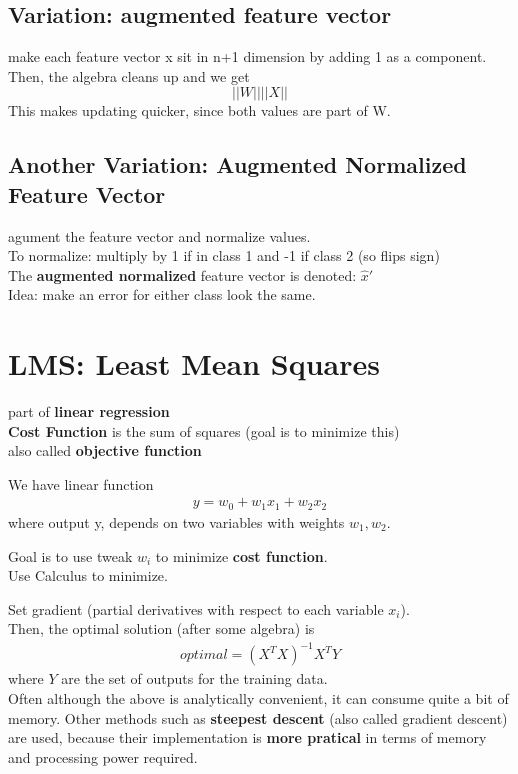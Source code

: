 \documentclass[12pt]{article}
\newcommand{\bt}[1]{\textbf{#1}} %
\newcommand{\eq}[1]{\begin{align*}#1\end{align*}} %
\newcommand{\eq}[1]{\begin{align*}#1\end{align*}} %
\begin{document}
\subsection*{Variation: augmented feature vector}
make each feature vector x sit in n+1 dimension by adding 1 as a component. Then, the algebra cleans up and we get 
$$||W|| ||X||$$
This makes updating quicker, since both values are part of W.

\subsection*{Another Variation: Augmented Normalized Feature Vector}
agument the feature vector and normalize values.\\

To normalize: multiply by 1 if in class 1 and -1 if class 2 (so flips sign)\\

The \bt{augmented normalized} feature vector is denoted: $\hat{x}'$ \\
Idea: make an error for either class look the same.



\section*{LMS: Least Mean Squares}
part of \bt{linear regression}\\
\bt{Cost Function} is the sum of squares (goal is to minimize this)\\
also called \bt{objective function}

We have linear function
\eq{y = w_0 + w_1 x_1 + w_2x_2}
where output y, depends on two variables with weights $w_1, w_2$.

Goal is to use tweak $w_i$ to minimize \bt{cost function}.\\

Use Calculus to minimize. 

Set gradient (partial derivatives with respect to each variable $x_i$). \\
Then, the optimal solution (after some algebra) is 
\eq{optimal = (X^TX)^{-1} X^T Y}
where $Y$ are the set of outputs for the training data.\\

Often although the above is analytically convenient, it can consume quite a bit of memory. Other methods such as \bt{steepest descent} (also called gradient descent) are used, because their implementation is \bt{more pratical} in terms of memory and processing power required.
\end{document}

